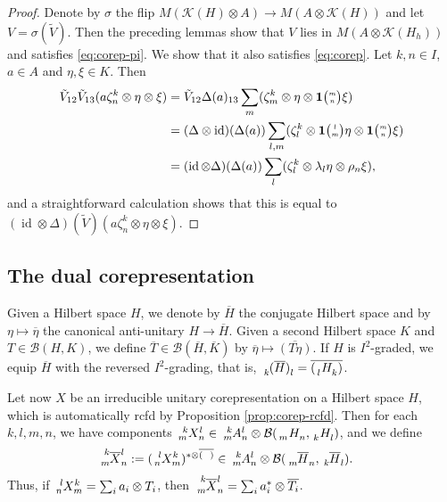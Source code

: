 \documentclass[11pt]{article}
\DeclareMathOperator{\id}{id}
\newcommand{\Grt}[3]{#1{\tiny {\begin{pmatrix} #2\\#3\end{pmatrix}}}}
\newcommand{\UnitC}[2]{\Grt{\mathbf{1}}{#1}{#2}}
\newcommand{\Gr}[5]{\,\tensor*[^{#2}_{#4}]{#1}{^{#3}_{#5}}}%
\newcommand{\Grd}[3]{\Gr{#1}{}{}{#2}{#3}}
\theoremstyle{definition}
\numberwithin{equation}{section}
\begin{document}
 \begin{proof}
   Denote by $\sigma$ the flip $ M(\mathcal{K}(H) \otimes A) \to M(A
   \otimes \mathcal{K}(H))$ and let $V=\sigma(\tilde V)$. Then the
   preceding lemmas show that $V$ lies in $M(A\otimes
   \mathcal{K}(H_{h}))$ and satisfies \eqref{eq:corep-pi}. We show
   that it also satisfies \eqref{eq:corep}. Let $k,n\in I$, $a\in A$ and $\eta,\xi \in K$. Then
 \begin{align*}
\tilde V_{12}\tilde V_{13}(a\zeta^{k}_{n} \otimes \eta\otimes \xi) &=
\tilde V_{12} \Delta(a)_{13}\sum_{m}(\zeta^{k}_{m} \otimes \eta \otimes \UnitC{m}{n}\xi) \\
&= (\Delta \otimes \id)(\Delta(a)) \sum_{l,m} (\zeta^{k}_{l} \otimes \UnitC{l}{m}\eta \otimes
\UnitC{m}{n}\xi)  \\
&= (\id \otimes \Delta)(\Delta(a))  \sum_{l} (\zeta^{k}_{l} \otimes \lambda_{l}\eta \otimes
\rho_{n}\xi),
\end{align*}
and a straightforward calculation shows that this is equal to $(\id \otimes \Delta)(\tilde
V)(a\zeta^{k}_{n} \otimes \eta\otimes \xi)$.
 \end{proof}
\subsection{The dual corepresentation}

Given a Hilbert space $H$, we denote by $\overline{H}$ the conjugate Hilbert space and by
$\eta\mapsto \overline{\eta}$ the canonical anti-unitary $H\to\overline{H}$. Given a second Hilbert
space $K$ and $T \in \mathcal{B}(H,K)$, we define $\overline{T}\in
\mathcal{B}(\overline{H},\overline{K})$ by $\overline{\eta} \mapsto \overline{(T\eta)}$.  If $H$ is
$I^{2}$-graded, we equip $\overline{H}$ with the reversed $I^{2}$-grading, that is,
$\Grd{(\overline{H})}{k}{l}=\overline{(\Grd{H}{l}{k})}$.

Let now $X$ be an irreducible unitary corepresentation on a Hilbert space $H$, which is
automatically rcfd by Proposition \ref{prop:corep-rcfd}. Then for each $k,l,m,n$, we have components
$\Gr{X}{k}{l}{m}{n} \in \Gr{A}{k}{l}{m}{n}\otimes \mathcal{B}(\Grd{H}{m}{n},\Grd{H}{k}{l})$, and we
define
\begin{align*}
  \Gr{\overline{X}}{k}{l}{m}{n} &:=  (\Gr{X}{l}{k}{n}{m})^{*\otimes \overline{(\phantom{T})}} \in
  \Gr{A}{k}{l}{m}{n} \otimes \mathcal{B}(\Grd{\overline{H}}{m}{n},\Grd{\overline{H}}{k}{l}).
\end{align*}
Thus, if $ \Gr{X}{l}{k}{n}{m} = \sum_{i} a_{i} \otimes T_{i}$, then $ \Gr{\overline{X}}{k}{l}{m}{n}
= \sum_{i} a_{i}^{*} \otimes \overline{T_{i}}$.
\end{document}
